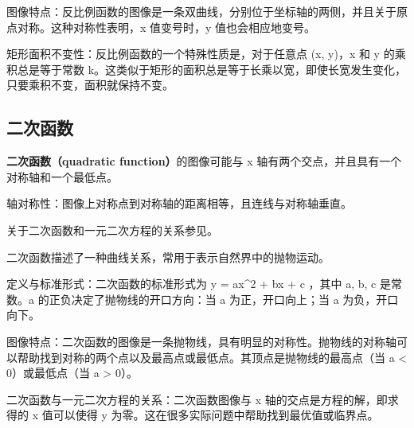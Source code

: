 图像特点：反比例函数的图像是一条双曲线，分别位于坐标轴的两侧，并且关于原点对称。这种对称性表明，x 值变号时，y 值也会相应地变号。

矩形面积不变性：反比例函数的一个特殊性质是，对于任意点 (x, y)，x 和 y 的乘积总是等于常数 k。这类似于矩形的面积总是等于长乘以宽，即使长宽发生变化，只要乘积不变，面积就保持不变。


\subsection{二次函数}

\textbf{二次函数（quadratic function）}的图像可能与  x  轴有两个交点，并且具有一个对称轴和一个最低点。

轴对称性：图像上对称点到对称轴的距离相等，且连线与对称轴垂直。

关于二次函数和一元二次方程的关系参见。

二次函数描述了一种曲线关系，常用于表示自然界中的抛物运动。

定义与标准形式：二次函数的标准形式为  y = ax^2 + bx + c ，其中 a, b, c 是常数。a 的正负决定了抛物线的开口方向：当 a 为正，开口向上；当 a 为负，开口向下。

图像特点：二次函数的图像是一条抛物线，具有明显的对称性。抛物线的对称轴可以帮助找到对称的两个点以及最高点或最低点。其顶点是抛物线的最高点（当 a < 0）或最低点（当 a > 0）。

二次函数与一元二次方程的关系：二次函数图像与 x 轴的交点是方程的解，即求得的 x 值可以使得 y 为零。这在很多实际问题中帮助找到最优值或临界点。
